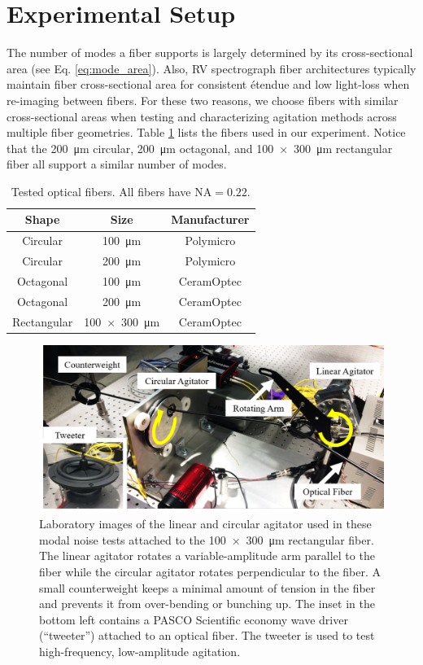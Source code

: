 \documentclass[twocolumn]{emulateapj}
\begin{document}
\section{Experimental Setup}
\label{sec:experimental_setup}

The number of modes a fiber supports is largely determined by its cross-sectional area (see Eq. \ref{eq:mode_area}). Also, RV spectrograph fiber architectures typically maintain fiber cross-sectional area for consistent \'etendue and low light-loss when re-imaging between fibers. For these two reasons, we choose fibers with similar cross-sectional areas when testing and characterizing agitation methods across multiple fiber geometries. Table \ref{table:fibers} lists the fibers used in our experiment. Notice that the \SI{200}{\micro\meter} circular, \SI{200}{\micro\meter} octagonal, and \SI{100x300}{\micro\meter} rectangular fiber all support a similar number of modes.

\begin{table}
\centering
\caption{Tested optical fibers. All fibers have $\mathrm{NA} = 0.22$.}
	\begin{tabular}{ccc}
	\hline
	Shape & Size & Manufacturer \\
	\hline
	\hline
	Circular & \SI{100}{\micro\meter} & Polymicro \\
	Circular & \SI{200}{\micro\meter} & Polymicro \\
	Octagonal & \SI{100}{\micro\meter} & CeramOptec \\
	Octagonal & \SI{200}{\micro\meter} & CeramOptec \\
	Rectangular & \SI{100x300}{\micro\meter} & CeramOptec \\
	\hline
	\end{tabular}
\label{table:fibers}
\end{table}

\begin{figure}
\centering
	\includegraphics[width=\columnwidth]{agitators_labelled.pdf}
	\caption{Laboratory images of the linear and circular agitator used in these modal noise tests attached to the \SI{100x300}{\micro\meter} rectangular fiber. The linear agitator rotates a variable-amplitude arm parallel to the fiber while the circular agitator rotates perpendicular to the fiber. A small counterweight keeps a minimal amount of tension in the fiber and prevents it from over-bending or bunching up. The inset in the bottom left contains a PASCO Scientific economy wave driver (``tweeter'') attached to an optical fiber. The tweeter is used to test high-frequency, low-amplitude agitation.}
\label{fig:agitators}
\end{figure}
\end{document}
